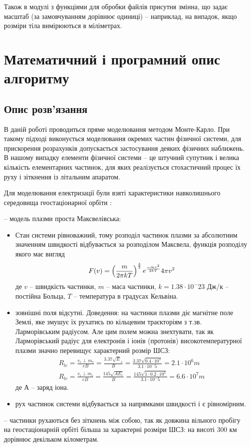 \documentclass[a4paper,12pt]{article}
\begin{document}
\bigskip

Також в модулі з функціями для обробки файлів присутня змінна, що задає масштаб (за замовчуванням дорівнює одиниці) -- наприклад, на випадок, якщо розміри тіла вимірюються в міліметрах.

\newpage

\section{Математичний і програмний опис алгоритму}
\subsection{Опис розв’язання}
В даній роботі проводиться пряме моделювання методом Монте-Карло. При такому підході виконується моделювання окремих частин фізичної системи, для прискорення розрахунків допускається застосування деяких фізичних наближень. В нашому випадку елементи фізичної системи -- це штучний супутник і велика кількість елементарних частинок, для яких реалізується стохастичний процес їх руху і зіткнення із літальним апаратом.

Для моделювання електризації були взяті характеристики навколишнього середовища геостаціонарної орбіти \cite{novikov}:

-- модель плазми проста Максвелівська:
\renewcommand{\labelitemi}{$\circ$}
\begin{itemize}
 \item Стан системи рівноважний, тому розподіл частинок плазми за абсолютним значенням швидкості відбувається за розподілом Максвела, функція розподілу якого має вигляд
\[
  F(v) = \left(\frac{m}{2 \pi k T}\right)^{3 \over 2} e^\frac{-mv^2}{2 k T} 4 \pi v^2
\]
 де $v$ -- швидкість частинки, $m$ -- маса частинки, $k = 1.38 \cdot 10^-23$ Дж/к -- постійна Больца, $T$ -- температура в градусах Кельвіна.
 \item зовнішні поля відсутні. Доведення: на частинки плазми діє магнітне поле Землі, яке змушує їх рухатись по кільцевим траєкторіям з т.зв. Ларморівським радіусом. Але цим полем можна знехтувати, так як Ларморівський радіус для електронів і іонів (протонів) високотемпературної плазми значно перевищує характерний розмір ШСЗ:
\begin{eqnarray}
 R_{le} = \frac{v_e \perp m_e}{eB} = \frac{3.37 \sqrt E_e}{B} = \frac{3.37 \sqrt {0.4 \cdot 10^3}}{3.1 \cdot 10^-5} = 2.1 \cdot 10^6 m \\
 R_{le} = \frac{v_i \perp m_i}{eB} = \frac{145 \sqrt {A E_i}}{B} = \frac{145 \sqrt {1 \cdot 0.2 \cdot 10^3}}{3.1 \cdot 10^-5} = 6.6 \cdot 10^7 m
\end{eqnarray}
де А -- заряд іона.
 \item рух частинок системи відбувається за напрямками швидкості і є рівномірним.
\end{itemize}
-- частинки рухаються без зіткнень між собою, так як довжина вільного пробігу на геостаціонарній орбіті більша за характерні розміри ШСЗ: на висоті 300 км дорівнює декільком кілометрам.
\end{document}
